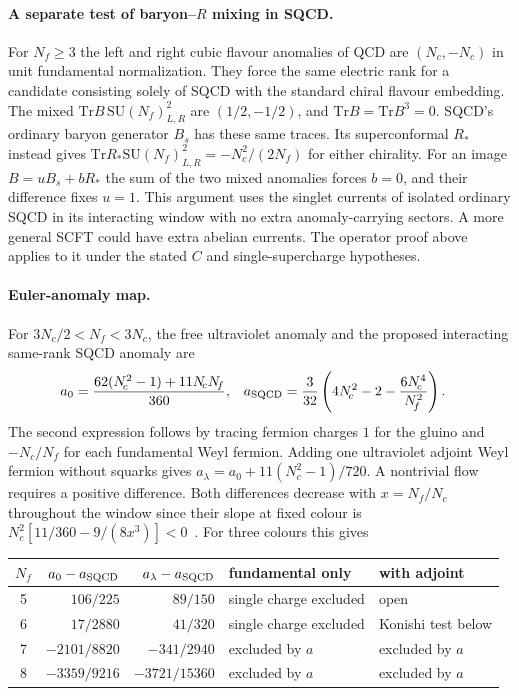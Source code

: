 \documentclass[11pt,a4paper]{article}
\theoremstyle{plain}
\theoremstyle{definition}
\theoremstyle{remark}
\newcommand{\Nc}{N_{\!c}}
\newcommand{\Nf}{N_{\!f}}
\newcommand{\SU}[1]{\mathrm{SU}(#1)}
\newcommand{\Tr}{\mathrm{Tr}}
\begin{document}
\paragraph{A separate test of baryon--$R$ mixing in SQCD.}
For $\Nf\geq3$ the left and right cubic flavour anomalies of QCD are
$(\Nc,-\Nc)$ in unit fundamental normalization. They force the same
electric rank for a candidate consisting solely of SQCD with the
standard chiral flavour embedding. The mixed
$\Tr B\,\SU{\Nf}_{L,R}^2$ are $(1/2,-1/2)$, and
$\Tr B=\Tr B^3=0$. SQCD's ordinary baryon generator $B_s$ has these
same traces. Its superconformal $R_*$ instead gives
$\Tr R_*\SU{\Nf}_{L,R}^2=-\Nc^2/(2\Nf)$ for either chirality.
For an image $B=uB_s+bR_*$ the sum of the two mixed anomalies
forces $b=0$, and their difference fixes $u=1$. This argument uses
the singlet currents of isolated ordinary SQCD in its interacting
window with no extra anomaly-carrying sectors. A more general SCFT
could have extra abelian currents. The operator proof above applies
to it under the stated $C$ and single-supercharge hypotheses.

\paragraph{Euler-anomaly map.}
For $3\Nc/2<\Nf<3\Nc$, the free ultraviolet anomaly and the proposed
interacting same-rank SQCD anomaly are
\begin{align}
 a_0&=\frac{62(\Nc^2-1)+11\Nc\Nf}{360},&
 a_{\rm SQCD}&=\frac{3}{32}\left(4\Nc^2-2-\frac{6\Nc^4}{\Nf^2}\right).
 \label{eq:endpoint-a}
\end{align}
The second expression follows by tracing fermion charges $1$ for
the gluino and $-\Nc/\Nf$ for each fundamental Weyl fermion.
Adding one ultraviolet adjoint Weyl fermion without squarks gives
$a_\lambda=a_0+11(\Nc^2-1)/720$. A nontrivial flow requires a
positive difference. Both differences decrease with $x=\Nf/\Nc$
throughout the window since their slope at fixed colour is
$\Nc^2[11/360-9/(8x^3)]<0$~\cite{Anselmi1998,Komargodski2011}.
For three colours this gives
\begin{center}
\begin{tabular}{crrll}
\toprule
$\Nf$ & $a_0-a_{\rm SQCD}$ & $a_\lambda-a_{\rm SQCD}$ & fundamental only & with adjoint\\
\midrule
5 & $106/225$ & $89/150$ & single charge excluded & open\\
6 & $17/2880$ & $41/320$ & single charge excluded & Konishi test below\\
7 & $-2101/8820$ & $-341/2940$ & excluded by $a$ & excluded by $a$\\
8 & $-3359/9216$ & $-3721/15360$ & excluded by $a$ & excluded by $a$\\
\bottomrule
\end{tabular}
\end{center}
\end{document}
